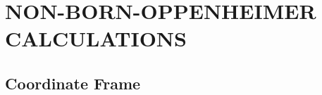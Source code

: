 \chapter{NON-BORN-OPPENHEIMER CALCULATIONS\label{nonBO}}

\section{Coordinate Frame}

\section{}

\section{}


